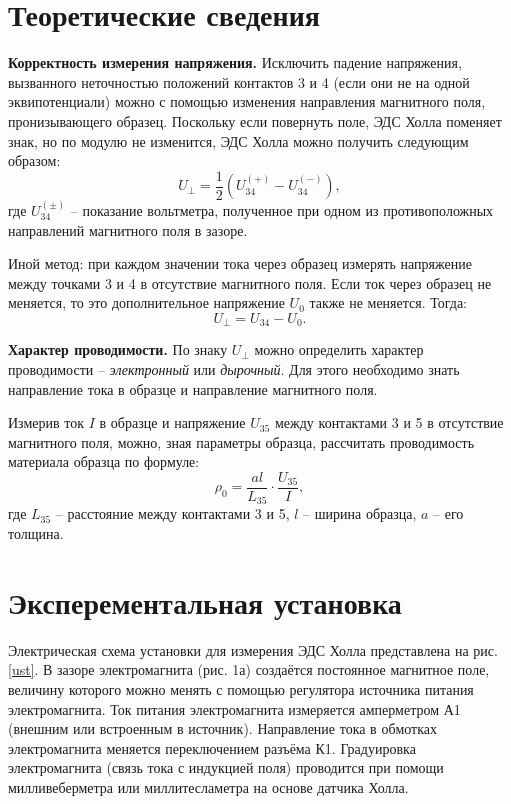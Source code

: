 \documentclass[a4paper,12pt]{article}
\begin{document}
\section{Теоретические сведения}

\textbf{Корректность измерения напряжения.} Исключить падение напряжения, вызванного неточностью положений контактов 3 и 4 (если они не на одной эквипотенциали) можно с помощью изменения направления магнитного поля, пронизывающего образец. Поскольку если повернуть поле, ЭДС Холла поменяет знак, но по модулю не изменится, ЭДС Холла можно получить следующим образом:
\begin{equation*}
    U_\perp = \frac{1}{2} (U_{34}^{(+)} - U_{34}^{(-)}),
\end{equation*}
где $U_{34}^{(\pm)}$ -- показание вольтметра, полученное при одном из противоположных направлений магнитного поля в зазоре.

Иной метод: при каждом значении тока через образец измерять напряжение между точками 3 и 4 в отсутствие магнитного поля. Если ток через образец не меняется, то это дополнительное напряжение $U_0$ также не меняется. Тогда:
\begin{equation*}
    U_\perp = U_{34} - U_0.
\end{equation*}

\textbf{Характер проводимости.} По знаку $U_\perp$ можно определить характер проводимости -- \textit{электронный} или \textit{дырочный}. Для этого необходимо знать направление тока в образце и направление магнитного поля.

Измерив ток $I$ в образце и напряжение $U_{35}$ между контактами 3 и 5 в отсутствие магнитного поля, можно, зная параметры образца, рассчитать проводимость материала образца по формуле:
\begin{equation*}
    \rho_0 = \frac{al}{L_{35}}\cdot\frac{U_{35}}{I},
\end{equation*}
где $L_{35}$ -- расстояние между контактами 3 и 5, $l$ -- ширина образца, $a$ -- его толщина.

\section{Эксперементальная установка}

Электрическая схема установки для измерения ЭДС Холла представлена на рис. \ref{ust}. В зазоре электромагнита (рис. 1а) создаётся постоянное магнитное поле, величину которого можно менять с помощью регулятора источника питания электромагнита. Ток питания электромагнита измеряется амперметром А1 (внешним или встроенным в источник). Направление тока в обмотках электромагнита меняется переключением разъёма К1. Градуировка электромагнита (связь тока с индукцией поля) проводится при помощи милливеберметра или миллитесламетра на основе датчика Холла. 
\end{document}
